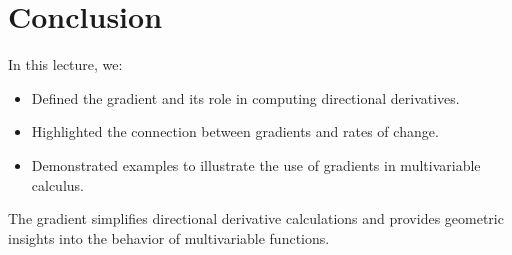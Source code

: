 \documentclass{article}
\begin{document}
\section*{Conclusion}

In this lecture, we:
\begin{itemize}
  \item Defined the gradient and its role in computing directional derivatives.
  \item Highlighted the connection between gradients and rates of change.
  \item Demonstrated examples to illustrate the use of gradients in multivariable calculus.
\end{itemize}

The gradient simplifies directional derivative calculations and provides geometric insights into the behavior of multivariable functions.
\end{document}
